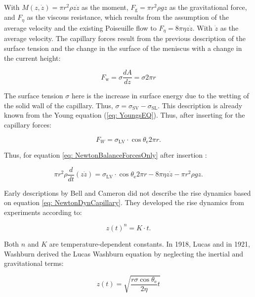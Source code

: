 With $M(z,\dot{z}) = \pi r^2 \rho z \dot{z}$ as the moment, $F_{\mathrm{g}} = \pi r^2 \rho g z$ as the gravitational force, and $F_{\eta}$ as the viscous resistance, which results from the assumption of the average velocity and the existing Poiseuille flow to $F_{\eta}=8\pi\eta z \dot{z}$. With $\dot{z}$ as the average velocity. The capillary forces result from the previous description of the surface tension and the change in the surface of the meniscus with a change in the current height:

\begin{equation}
    F_{\mathrm{w}}=\sigma \frac{dA}{dz} = \sigma 2\pi r
\end{equation}

The surface tension $\sigma$ here is the increase in surface energy due to the wetting of the solid wall of the capillary. Thus, $\sigma = \sigma_{\mathrm{SV}}- \sigma_{\mathrm{SL}}$. This description is already known from the Young equation (\ref{eq: YoungsEQ}). Thus, after inserting for the capillary forces:

\begin{equation}
    F_W = \sigma_{\mathrm{LV}} \cdot \cos \theta_{\mathrm{e}} 2\pi r.
\end{equation}

Thus, for equation \ref{eq: NewtonBalanceForcesOnly} after insertion \cite{fricke2023AnalyticalStudyCapillary}:

\begin{equation}
\label{eq: NewtonDynCapillary}
    \pi r^2 \rho \frac{d}{dt} (z \dot{z}) = \sigma_{\mathrm{LV}} \cdot \cos \theta_{\mathrm{e}} 2\pi r-8\pi\eta z \dot{z}-\pi r^2 \rho g z.
\end{equation}

Early descriptions by Bell and Cameron \cite{bell1906FlowLiquidsCapillary} did not describe the rise dynamics based on equation \ref{eq: NewtonDynCapillary}. They developed the rise dynamics from experiments according to:

\begin{equation}
    z(t)^n = K\cdot t.
\end{equation}

Both $n$ and $K$ are temperature-dependent constants. In 1918, Lucas \cite{lucas1918UeberZeitgesetzKapillaren} and in 1921, Washburn \cite{washburn1921DynamicsCapillaryFlow} derived the Lucas Washburn equation by neglecting the inertial and gravitational terms:

\begin{equation}
\label{eq: LW-Eq}
    z(t) = \sqrt{\frac{r\sigma\cos\theta_{\mathrm{e}}}{2\eta}t}
\end{equation}

